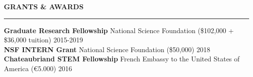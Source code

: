 \documentclass{resume} %
\begin{document}




\vspace{.25cm}

\begin{minipage}{\textwidth}

\sectionskip
\MakeUppercase{\textbf{Grants \& Awards}}
  \sectionlineskip
  \hrule

\vspace{.5cm}




{\bf Graduate Research Fellowship} \hfill {\footnotesize National Science Foundation (\$102,000 + \$36,000 tuition)} \hfill  {2015-2019} \\


{\bf NSF INTERN Grant} \hfill {\footnotesize National Science Foundation (\${50,000})} \hfill {2018} \\ 


{\bf Chateaubriand STEM Fellowship} \hfill {\footnotesize French Embassy to the United States of America (\euro{5.000}) } \hfill {2016} \\


\end{minipage}
\end{document}
